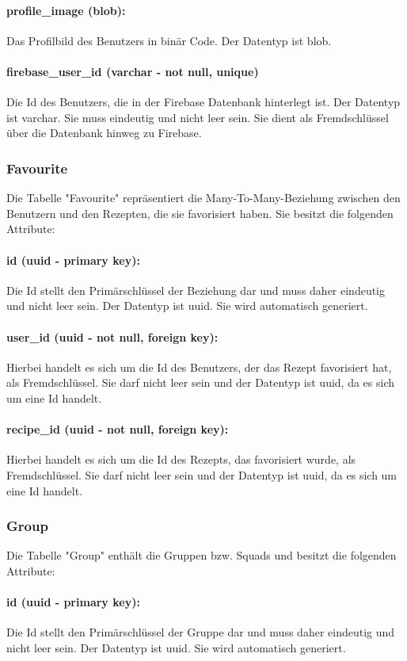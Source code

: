 \documentclass[parskip=full]{scrartcl}
\begin{document}
\paragraph{profile\_image (blob):} Das Profilbild des Benutzers in binär Code. Der Datentyp ist \Gls{blob}.
\paragraph{firebase\_user\_id (varchar - not null, unique)} Die Id des Benutzers, die in der Firebase Datenbank hinterlegt ist. Der Datentyp ist \Gls{varchar}. Sie muss eindeutig und nicht leer sein. Sie dient als Fremdschlüssel über die Datenbank hinweg zu Firebase.
\newpage
\subsubsection{Favourite}
Die Tabelle "Favourite" repräsentiert die Many-To-Many-Beziehung zwischen den Benutzern und den Rezepten, die sie favorisiert haben. Sie besitzt die folgenden Attribute:
\paragraph{id (uuid - primary key):} Die Id stellt den Primärschlüssel der Beziehung dar und muss daher eindeutig und nicht leer sein. Der Datentyp ist \Gls{uuid}. Sie wird automatisch generiert.
\paragraph{user\_id (uuid - not null, foreign key):} Hierbei handelt es sich um die Id des Benutzers, der das Rezept favorisiert hat, als Fremdschlüssel. Sie darf nicht leer sein und der Datentyp ist \Gls{uuid}, da es sich um eine Id handelt.
\paragraph{recipe\_id (uuid - not null, foreign key):} Hierbei handelt es sich um die Id des Rezepts, das favorisiert wurde, als Fremdschlüssel. Sie darf nicht leer sein und der Datentyp ist \Gls{uuid}, da es sich um eine Id handelt.
\newpage
\subsubsection{Group}
Die Tabelle "Group" enthält die Gruppen bzw. Squads und besitzt die folgenden Attribute:
\paragraph{id (uuid - primary key):} Die Id stellt den Primärschlüssel der Gruppe dar und muss daher eindeutig und nicht leer sein. Der Datentyp ist \Gls{uuid}. Sie wird automatisch generiert.
\end{document}
